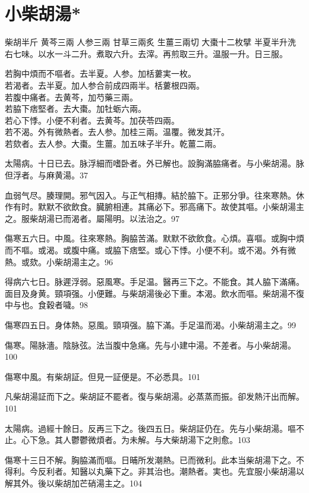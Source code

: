 \section{小柴胡湯*}

柴胡{\scriptsize 半斤} 黄芩{\scriptsize 三兩} 人参{\scriptsize 三兩} 甘草{\scriptsize 三兩炙} 生薑{\scriptsize 三兩切} 大棗{\scriptsize 十二枚擘} 半夏{\scriptsize 半升洗}\\
右七味。以水一斗二升。煮取六升。去滓。再煎取三升。温服一升。日三服。

若胸中煩而不嘔者。去半夏。人参。加栝蔞実一枚。\\
若渴者。去半夏。加人参合前成四兩半。栝蔞根四兩。\\
若腹中痛者。去黄芩，加芍藥三兩。\\
若脇下痞堅者。去大棗。加牡蛎六兩。\\
若心下悸。小便不利者。去黄芩。加茯苓四兩。\\
若不渴。外有微熱者。去人参。加桂三兩。温覆。微发其汗。\\
若欬者。去人参。大棗。生薑。加五味子半升。乾薑二兩。

太陽病。十日已去。脉浮細而嗜卧者。外已解也。設胸滿脇痛者。与小柴胡湯。脉{\khaaitp 但}浮者。与麻黄湯。37

血弱气尽。腠理開。邪气因入。与正气相摶。結於脇下。正邪分爭。往來寒熱。休作有时。默默不欲飲食。臓腑相連。其痛必下。邪高痛下。故使其嘔。小柴胡湯主之。服柴胡湯已而渴者。屬陽明。以法治之。97

傷寒五六日。中風。往來寒熱。胸脇苦滿。默默不欲飲食。心煩。喜嘔。或胸中煩而不嘔。或渴。或腹中痛。或脇下痞堅。或心下悸。小便不利。或不渴。外有微熱。或欬。小柴胡湯主之。96

得病六七日。脉遲浮弱。惡風寒。手足温。醫再三下之。不能食。其人脇下滿{\khaaitp 痛}。面目及身黄。頸項强。小便難。与柴胡湯後必下重。本渴。飲水而嘔。柴胡{\khaaitp 湯}不復中与也。食穀者噦。98

傷寒四五日。身{\khaaitp 体}熱。惡風。頸項强。脇下滿。手足温而渴。小柴胡湯主之。99

傷寒。陽脉濇。陰脉弦。法当腹中急痛。先与小建中湯。不差者。与小柴胡湯。100

傷寒中風。有柴胡証。但見一証便是。不必悉具。101

凡柴胡湯証而下之。柴胡証不罷者。復与柴胡湯。必蒸蒸而振。卻发熱汗出而解。101

太陽病。過經十餘日。反再三下之。後四五日。柴胡証仍在。先与小柴胡湯。嘔不止。心下急。其人鬱鬱微煩者。为未解。与大柴胡湯下之則愈。103

傷寒十三日不解。胸脇滿而嘔。日晡所发潮熱{\khaaitp 。已}而微利。此本当柴胡湯下之。不得利。今反利者。知醫以丸藥下之。非其治也。潮熱者。実也。先宜服小柴胡湯以解其外。後以柴胡加芒硝湯主之。104

